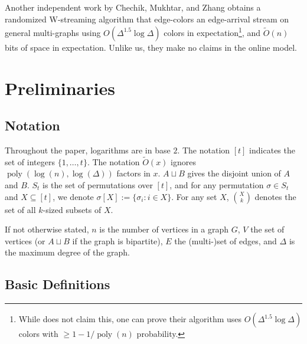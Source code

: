 \documentclass[10pt]{article}
\theoremstyle{definition}\newtheorem{definition}[lemma]{Definition}
\theoremstyle{remark}  \newtheorem*{remark}{Remark}
\newcommand{\tO}{\widetilde{O}}
\DeclareMathOperator{\poly}{poly}
\begin{document}
Another independent work by Chechik, Mukhtar, and Zhang \cite{ChechikMZ23} obtains a randomized W-streaming algorithm that edge-colors an edge-arrival stream on general multi-graphs using $O(\Delta^{1.5} \log \Delta)$ colors in expectation\footnote{While \cite{ChechikMZ23} does not claim this, one can prove their algorithm uses $O(\Delta^{1.5} \log \Delta)$ colors with $\ge 1 - 1/\poly(n)$ probability.}, and $\tO(n)$ bits of space in expectation. Unlike us, they make no claims in the online model. 

\section{Preliminaries}
\subsection{Notation}

Throughout the paper, logarithms are in base $2$. The notation $[t]$ indicates the set of integers $\{1,\ldots,t\}$. The notation 
 $\tO(x)$ ignores $\poly(\log(n),\log(\Delta))$ factors in $x$. $A \sqcup B$ gives the disjoint union of $A$ and $B$. $S_t$ is the set of permutations over $[t]$, and for any permutation $\sigma \in S_t$ and $X\subseteq [t]$, we denote $\sigma[X] := \{\sigma_i : i \in X\}$. For any set $X$, $\binom{X}{k}$ denotes the set of all $k$-sized subsets of $X$.

If not otherwise stated, $n$ is the number of vertices in a graph $G$, $V$ the set of vertices (or $A \sqcup B$ if the graph is bipartite), $E$ the (multi-)set of edges, and $\Delta$ is the maximum degree of the graph.

\subsection{Basic Definitions}
\end{document}
